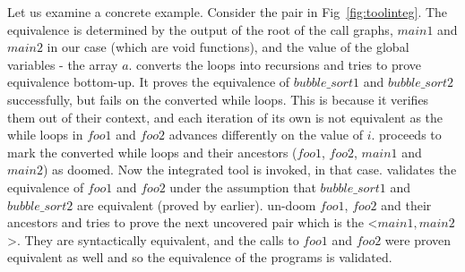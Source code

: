 Let us examine a concrete example. Consider the pair in Fig~\ref{fig:toolinteg}. The equivalence is determined by the output of the root of the call graphs, $main1$ and $main2$ in our case (which are void functions), and the value of the global variables - the array $a$.
 converts the loops into recursions and tries to prove equivalence bottom-up. It proves the equivalence of $bubble\_sort1$ and $bubble\_sort2$ successfully, but fails on the converted while loops. This is because it verifies them out of their context, and each iteration of its own is not equivalent as the while loops in $foo1$ and $foo2$ advances differently on the value of $i$.  proceeds to mark the converted while loops and their ancestors ($foo1$, $foo2$, $main1$ and $main2$) as doomed. Now the integrated tool is invoked,  in that case.  validates the equivalence of $foo1$ and $foo2$ under the assumption that $bubble\_sort1$ and $bubble\_sort2$ are equivalent (proved by  earlier).  un-doom $foo1$, $foo2$ and their ancestors and tries to prove the next uncovered pair which is the <$main1,main2$>. They are syntactically equivalent, and the calls to $foo1$ and $foo2$ were proven equivalent as well and so the equivalence of the programs is validated.



